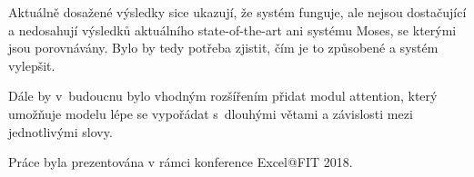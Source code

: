 Aktuálně dosažené výsledky sice ukazují, že systém funguje, ale nejsou dostačující a nedosahují výsledků aktuálního state-of-the-art ani systému Moses, se kterými jsou porovnávány. Bylo by tedy potřeba zjistit, čím je to způsobené a systém vylepšit.

Dále by v~budoucnu bylo vhodným rozšířením přidat modul attention, který umožňuje modelu lépe se vypořádat s~dlouhými větami a závislosti mezi jednotlivými slovy.

Práce byla prezentována v rámci konference Excel@FIT 2018.

%

